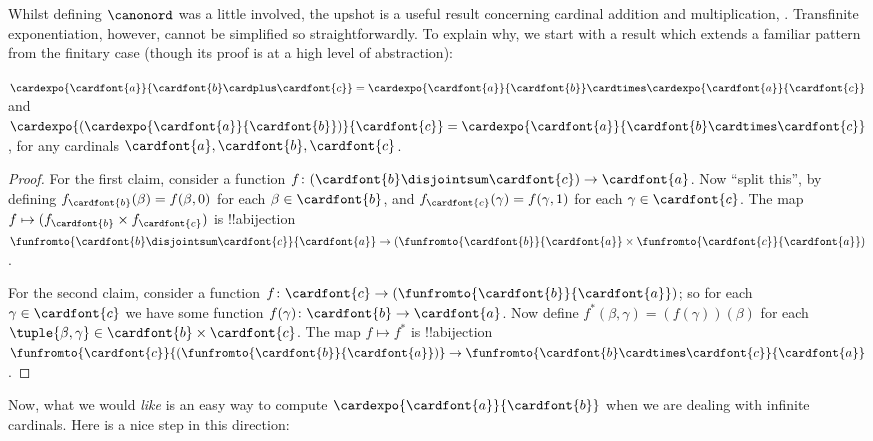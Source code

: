 \documentclass[../../../include/open-logic-section]{subfiles}
\begin{document}


Whilst defining $\canonord$ was a little involved, the upshot is a
useful result concerning cardinal addition and multiplication,
. Transfinite exponentiation, however,
cannot be simplified so straightforwardly. To explain why, we start
with a result which extends a familiar pattern from the finitary case
(though its proof is at a high level of abstraction):

\begin{prop}
$\cardexpo{\cardfont{a}}{\cardfont{b} \cardplus \cardfont{c}} =
\cardexpo{\cardfont{a}}{\cardfont{b}} \cardtimes
\cardexpo{\cardfont{a}}{\cardfont{c}}$ and
$\cardexpo{(\cardexpo{\cardfont{a}}{\cardfont{b}})}{\cardfont{c}} =
\cardexpo{\cardfont{a}}{\cardfont{b} \cardtimes \cardfont{c}}$, for
any cardinals $\cardfont{a}, \cardfont{b}, \cardfont{c}$.
\end{prop}

\begin{proof}
For the first claim, consider a function $f \colon
(\cardfont{b}\disjointsum\cardfont{c}) \to \cardfont{a}$. Now ``split
this'', by defining $f_\cardfont{b}(\beta) = f(\beta, 0)$ for each
$\beta \in \cardfont{b}$, and $f_\cardfont{c}(\gamma) = f(\gamma, 1)$
for each $\gamma \in \cardfont{c}$. The map $f \mapsto
(f_{\cardfont{b}} \times f_\cardfont{c})$ is !!a{bijection}
$\funfromto{\cardfont{b} \disjointsum \cardfont{c}}{\cardfont{a}} \to
(\funfromto{\cardfont{b}}{\cardfont{a}} \times
\funfromto{\cardfont{c}}{\cardfont{a}})$. 

For the second claim, consider a function $f \colon \cardfont{c} \to
(\funfromto{\cardfont{b}}{\cardfont{a}})$; so for each $\gamma \in
\cardfont{c}$ we have some function $f(\gamma) \colon \cardfont{b} \to
\cardfont{a}$. Now define $f^*(\beta, \gamma) = (f(\gamma))(\beta)$
for each $\tuple{\beta, \gamma} \in \cardfont{b} \times \cardfont{c}$.
The map $f \mapsto f^*$ is !!a{bijection}
$\funfromto{\cardfont{c}}{(\funfromto{\cardfont{b}}{\cardfont{a}})}
\to \funfromto{\cardfont{b} \cardtimes \cardfont{c}}{\cardfont{a}}$. 
\end{proof}

Now, what we would \emph{like} is an easy way to compute
$\cardexpo{\cardfont{a}}{\cardfont{b}}$ when we are dealing with
infinite cardinals. Here is a nice step in this direction:
\end{document}
